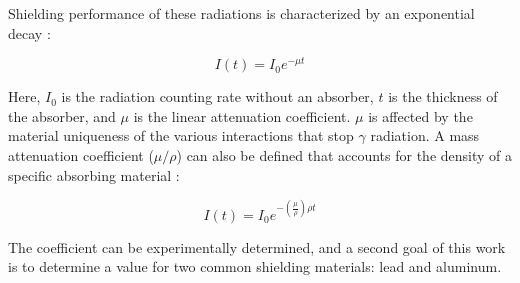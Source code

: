 Shielding performance of these radiations is characterized by an exponential decay \cite{knoll}:

\begin{equation}
I(t) = I_{0}e^{-\mu t}
\end{equation}

Here, $I_{0}$ is the radiation counting rate without an absorber, $t$ is the thickness of the absorber, and $\mu$ is the linear attenuation coefficient. $\mu$ is affected by the material uniqueness of the various interactions that stop $\gamma$ radiation. A mass attenuation coefficient ($\mu/\rho$) can also be defined that accounts for the density of a specific absorbing material \cite{knoll}:

\begin{equation}
I(t) = I_{0}e^{-(\frac{\mu}{\rho})\rho t}
\label{eq:decay}
\end{equation}

The coefficient can be experimentally determined, and a second goal of this work is to determine a value for two common shielding materials: lead and aluminum.
